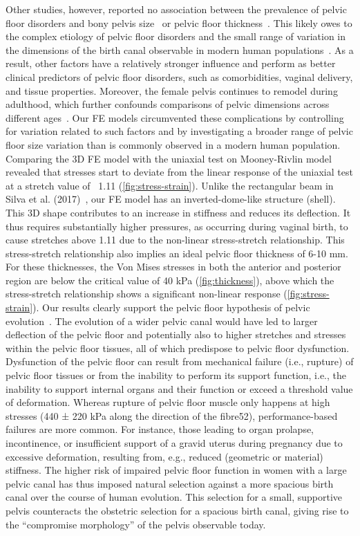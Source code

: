 \documentclass[9pt,twocolumn,twoside]{pnas-new}
\begin{document}
Other studies, however, reported no association between the prevalence of pelvic floor disorders and bony pelvis size~\cite{Handa2003-fp, Stein2009-fq} or pelvic floor thickness~\cite{Yasar2019-ga}. This likely owes to the complex etiology of pelvic floor disorders and the small range of variation in the dimensions of the birth canal observable in modern human populations~\cite{Athanasiou2007-qg,Grabowski2013-ze}. As a result, other factors have a relatively stronger influence and perform as better clinical predictors of pelvic floor disorders, such as comorbidities, vaginal delivery, and tissue properties. Moreover, the female pelvis continues to remodel during adulthood, which further confounds comparisons of pelvic dimensions across different ages~\cite{Grabowski2013-ze,Ricklan2020-bs,Huseynov2016-qg}. Our FE models circumvented these complications by controlling for variation related to such factors and by investigating a broader range of pelvic floor size variation than is commonly observed in a modern human population. 
Comparing the 3D FE model with the uniaxial test on Mooney-Rivlin model revealed that stresses start to deviate from the linear response of the uniaxial test at a stretch value of ~1.11 (\cref{fig:stress-strain}). Unlike the rectangular beam in Silva et al. (2017)~\cite{Silva2017-uz}, our FE model has an inverted-dome-like structure (shell). This 3D shape contributes to an increase in stiffness and reduces its deflection. It thus requires substantially higher pressures, as occurring during vaginal birth, to cause stretches above 1.11 due to the non-linear stress-stretch relationship. This stress-stretch relationship also implies an ideal pelvic floor thickness of 6-10 mm. For these thicknesses, the Von Mises stresses in both the anterior and posterior region are below the critical value of 40 kPa (\cref{fig:thickness}), above which the stress-stretch relationship shows a significant non-linear response (\cref{fig:stress-strain}).
Our results clearly support the pelvic floor hypothesis of pelvic evolution~\cite{Mitteroecker2016-cd}. The evolution of a wider pelvic canal would have led to larger deflection of the pelvic floor and potentially also to higher stretches and stresses within the pelvic floor tissues, all of which predispose to pelvic floor dysfunction. Dysfunction of the pelvic floor can result from mechanical failure (i.e., rupture) of pelvic floor tissues or from the inability to perform its support function, i.e., the inability to support internal organs and their function or exceed a threshold value of deformation. Whereas rupture of pelvic floor muscle only happens at high stresses (440 ± 220 kPa along the direction of the fibre52), performance-based failures are more common. For instance, those leading to organ prolapse, incontinence, or insufficient support of a gravid uterus during pregnancy due to excessive deformation, resulting from, e.g., reduced (geometric or material) stiffness. The higher risk of impaired pelvic floor function in women with a large pelvic canal has thus imposed natural selection against a more spacious birth canal over the course of human evolution.  This selection for a small, supportive pelvis counteracts the obstetric selection for a spacious birth canal, giving rise to the ``compromise morphology” of the pelvis observable today.
\end{document}
